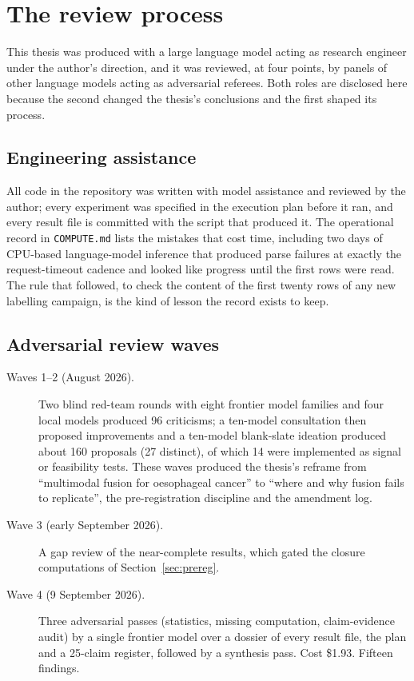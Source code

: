 \chapter{The review process}
\label{app:review}

This thesis was produced with a large language model acting as research engineer under the author's direction, and it was reviewed, at four points, by panels of other language models acting as adversarial referees. Both roles are disclosed here because the second changed the thesis's conclusions and the first shaped its process.

\section{Engineering assistance}

All code in the repository was written with model assistance and reviewed by the author; every experiment was specified in the execution plan before it ran, and every result file is committed with the script that produced it. The operational record in \texttt{COMPUTE.md} lists the mistakes that cost time, including two days of CPU-based language-model inference that produced parse failures at exactly the request-timeout cadence and looked like progress until the first rows were read. The rule that followed, to check the content of the first twenty rows of any new labelling campaign, is the kind of lesson the record exists to keep.

\section{Adversarial review waves}

\begin{description}
\item[Waves 1--2 (August 2026).] Two blind red-team rounds with eight frontier model families and four local models produced 96 criticisms; a ten-model consultation then proposed improvements and a ten-model blank-slate ideation produced about 160 proposals (27 distinct), of which 14 were implemented as signal or feasibility tests. These waves produced the thesis's reframe from ``multimodal fusion for oesophageal cancer'' to ``where and why fusion fails to replicate'', the pre-registration discipline and the amendment log.
\item[Wave 3 (early September 2026).] A gap review of the near-complete results, which gated the closure computations of Section~\ref{sec:prereg}.
\item[Wave 4 (9 September 2026).] Three adversarial passes (statistics, missing computation, claim-evidence audit) by a single frontier model over a dossier of every result file, the plan and a 25-claim register, followed by a synthesis pass. Cost \$1.93. Fifteen findings.
\end{description}

